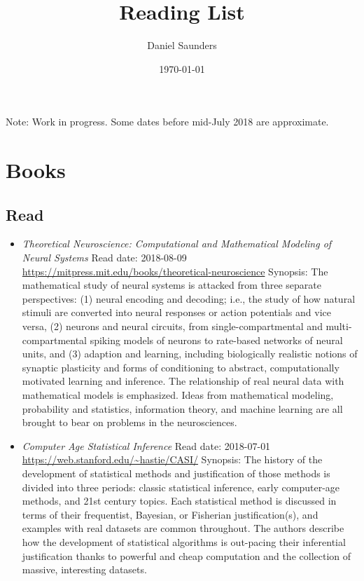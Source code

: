 \documentclass{article}%
\title{Reading List}%
\author{Daniel Saunders}%
\date{\today}%
\begin{document}
%
\normalsize%
\maketitle%
Note: Work in progress. Some dates before mid{-}July 2018 are approximate.%
\section{Books}%
\label{sec:Books}%
\subsection{Read}%
\label{subsec:Read}%
\begin{itemize}%
\item%
\textit{Theoretical Neuroscience: Computational and Mathematical Modeling of Neural Systems}%
\newline%
Read date: 2018{-}08{-}09%
\newline%
\href{https://mitpress.mit.edu/books/theoretical{-}neuroscience}{https://mitpress.mit.edu/books/theoretical{-}neuroscience}%
\newline%
Synopsis: The mathematical study of neural systems is attacked from three separate perspectives: (1) neural encoding and decoding; i.e., the study of how natural stimuli are converted into neural responses or action potentials and vice versa, (2) neurons and neural circuits, from single{-}compartmental and multi{-}compartmental spiking models of neurons to rate{-}based networks of neural units, and (3) adaption and learning, including biologically realistic notions of synaptic plasticity and forms of conditioning to abstract, computationally motivated learning and inference. The relationship of real neural data with mathematical models is emphasized. Ideas from mathematical modeling, probability and statistics, information theory, and machine learning are all brought to bear on problems in the neurosciences.%
\item%
\textit{Computer Age Statistical Inference}%
\newline%
Read date: 2018{-}07{-}01%
\newline%
\href{https://web.stanford.edu/\textasciitilde{}hastie/CASI/}{https://web.stanford.edu/\textasciitilde{}hastie/CASI/}%
\newline%
Synopsis: The history of the development of statistical methods and justification of those methods is divided into three periods: classic statistical inference, early computer{-}age methods, and 21st century topics. Each statistical method is discussed in terms of their frequentist, Bayesian, or Fisherian justification(s), and examples with real datasets are common throughout. The authors describe how the development of statistical algorithms is out{-}pacing their inferential justification thanks to powerful and cheap computation and the collection of massive, interesting datasets.%

\end{itemize}
\end{document}
